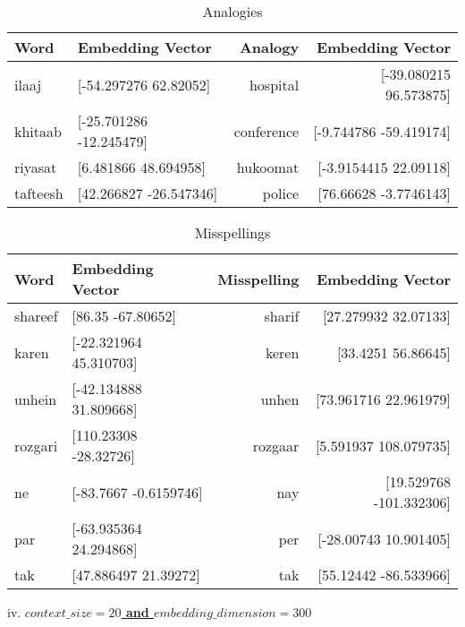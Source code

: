 \documentclass{exam}
\begin{document}
\begin{table}[h!]
  			\begin{center}
    			\caption{Analogies}
    			\begin{tabular}{l|l|r|r}
      				\textbf{Word} & \textbf{Embedding Vector} & \textbf{Analogy} & \textbf{Embedding Vector}\\
      				\hline
      				ilaaj & [-54.297276  62.82052] & hospital & [-39.080215  96.573875]\\
      				khitaab & [-25.701286 -12.245479] & conference & [-9.744786 -59.419174] \\
      				riyasat & [6.481866 48.694958] & hukoomat & [-3.9154415 22.09118]\\
      				tafteesh & [42.266827 -26.547346] & police & [76.66628   -3.7746143]\\
    			\end{tabular}
  			\end{center}
\end{table}

\begin{table}[h!]
  			\begin{center}
    			\caption{Misspellings}
    			\begin{tabular}{l|l|r|r}
      				\textbf{Word} & \textbf{Embedding Vector} & \textbf{Misspelling} & \textbf{Embedding Vector}\\
      				\hline
      				shareef & [86.35    -67.80652] & sharif & [27.279932 32.07133]\\
      				karen & [-22.321964  45.310703] & keren & [33.4251  56.86645]\\
      				unhein & [-42.134888  31.809668] & unhen & [73.961716 22.961979]\\
      				rozgari & [110.23308 -28.32726] & rozgaar & [5.591937 108.079735]\\
      				ne & [-83.7667     -0.6159746] & nay & [19.529768 -101.332306]\\
      				par & [-63.935364  24.294868] & per & [-28.00743   10.901405]\\
     				tak & [47.886497 21.39272] & tak & [55.12442  -86.533966]\\
    			\end{tabular}
  			\end{center}
\end{table}
\pagebreak

iv. \underline{\textbf{$context\_size = 20$ and $embedding\_dimension = 300$}}\\
\end{document}
